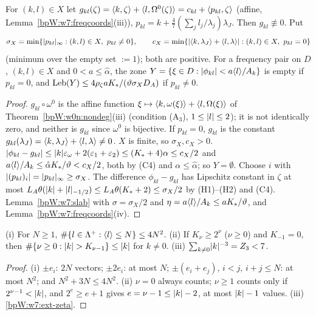 \begin{lemma}\label{bpW:w7:Xzones}
For $(k,l)\in X$ let $g_{kl}(\zeta)=\langle k,\zeta\rangle+\langle l,\Omega^0(\zeta)\rangle=c_{kl}+\langle p_{kl},\zeta\rangle$ (affine,
Lemma~\ref{bpW:w7:freqcoords}(iii)), $p_{kl}=k+\frac47(\sum_jl_j/\lambda_j)\lambda_J$. Then $g_{kl}\not\equiv0$. Put
\[\sigma_X=\min\{\abs{p_{kl}}_\infty:(k,l)\in X,\ p_{kl}\ne0\},\qquad
c_X=\min\{\abs{\avg{k,\lambda_J}+\avg{l,\lambda}}:(k,l)\in X,\ p_{kl}=0\}\]
(minimum over the empty set $:=1$); both are positive. For a frequency pair on $D$, $(k,l)\in X$ and
$0<a\le\hat\alpha$, the zone $Y=\{\xi\in D:\lvert \phi_{kl}\rvert<a\langle l\rangle/A_k\}$ is empty if $p_{kl}=0$, and
$\operatorname{Leb}(Y)\le4\rho_\zeta aK_*/(\vartheta\sigma_XD_A)$ if $p_{kl}\ne0$.
\end{lemma}
\begin{proof}
\label{stepW:w7:X-A3}
$g_{kl}\circ\omega^0$ is the affine function $\xi\mapsto\langle k,\omega(\xi)\rangle+\langle l,\Omega(\xi)\rangle$ of
Theorem~\ref{bpW:w0n:nondeg}(iii) (condition (A$_3$), $1\le\lvert l\rvert\le2$); it is not identically zero, and neither is
$g_{kl}$ since $\omega^0$ is bijective. If $p_{kl}=0$, $g_{kl}$ is the constant $g_{kl}(\lambda_J)=\langle k,\lambda_J\rangle
+\langle l,\lambda\rangle\ne0$. $X$ is finite, so $\sigma_X,c_X>0$.
\label{stepW:w7:X-const}
$\lvert \phi_{kl}-g_{kl}\rvert\le\lvert k\rvert\varepsilon_\omega+2(\varepsilon_1+\varepsilon_2)\le(K_*+4)\alpha\le c_X/2$ and
$a\langle l\rangle/A_k\le\hat\alpha K_*/\vartheta<c_X/2$, both by (C4) and $\alpha\le\hat\alpha$; so $Y=\emptyset$.
\label{stepW:w7:X-slope}
Choose $i$ with $\lvert (p_{kl})_i\rvert=\lvert p_{kl}\rvert_\infty\ge\sigma_X$. The difference $\phi_{kl}-g_{kl}$ has Lipschitz
constant in $\zeta$ at most $L_A\theta(\lvert k\rvert+\lvert l\rvert_{-1/2})\le L_A\theta(K_*+2)\le\sigma_X/2$ by (H1)--(H2) and (C4).
Lemma~\ref{bpW:w7:slab} with $\sigma=\sigma_X/2$ and $\eta=a\langle l\rangle/A_k\le aK_*/\vartheta$, and
Lemma~\ref{bpW:w7:freqcoords}(iv).
\end{proof}

\begin{lemma}[Counting]\label{bpW:w7:count}
(i) For $N\ge1$, $\#\{l\in\Lambda^+:\langle l\rangle\le N\}\le4N^2$. (ii) If $K_\nu\ge2^\nu$ ($\nu\ge0$) and $K_{-1}=0$, then
$\#\{\nu\ge0:\lvert k\rvert>K_{\nu-1}\}\le\lvert k\rvert$ for $k\ne0$. (iii) $\sum_{k\ne0}\lvert k\rvert^{-3}=Z_3<7$.
\end{lemma}
\begin{proof}
(i) $\pm e_i$: $2N$ vectors; $\pm2e_i$: at most $N$; $\pm(e_i+e_j)$, $i<j$, $i+j\le N$: at most $N^2$; and
$N^2+3N\le4N^2$. (ii) $\nu=0$ always counts; $\nu\ge1$ counts only if $2^{\nu-1}<\lvert k\rvert$, and $2^e\ge e+1$ gives
$e=\nu-1\le\lvert k\rvert-2$, at most $\lvert k\rvert-1$ values. (iii) \ref{bpW:w7:ext-zeta}.
\end{proof}


